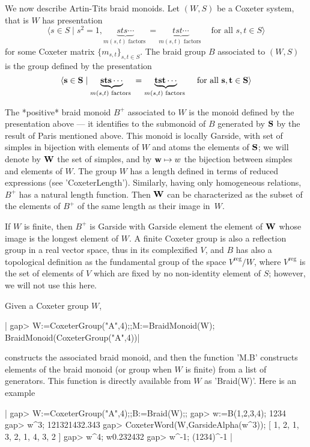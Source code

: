 We  now describe Artin-Tits braid monoids. Let $(W,S)$ be a Coxeter system,
that is $W$ has presentation
$$
  \langle s\in S \mid s^2=1,
         \underbrace{sts\cdots}_{m(s,t)\text{ factors }}=
         \underbrace{tst\cdots}_{m(s,t)\text{ factors }}
    \quad \text{for all $s,t\in S$} \rangle
$$
for some Coxeter matrix $\{m_{s,t}\}_{s,t\in S}$. The braid group $B$
associated to $(W,S)$ is the group defined by the presentation
$$
   \langle {\bf s}\in{\bf S}\mid
         \underbrace{{\bf s}{\bf t}{\bf s}\cdots}_{m(s,t)\text{ factors }}=
         \underbrace{{\bf t}{\bf s}{\bf t}\cdots}_{m(s,t)\text{ factors }}
    \quad \text{for all ${\bf s},{\bf t}\in{\bf S}$}\rangle
$$

The  *positive* braid monoid $B^+$ associated  to $W$ is the monoid defined
by  the  presentation  above  ---  it  identifies  to  the submonoid of $B$
generated  by ${\bf S}$ by the result of Paris mentioned above. This monoid
is  locally Garside, with set of simples  in bijection with elements of $W$
and  atoms  the  elements  of  ${\bf S}$;  we  will  denote by ${\bf W}$ the set of
simples,  and by ${\bf w}\mapsto w$ the  bijection between simples and elements
of  $W$. The group $W$ has a length defined in terms of reduced expressions
(see  'CoxeterLength'). Similarly, having only homogeneous relations, $B^+$
has  a  natural  length  function.  Then  ${\bf W}$ can be characterized as the
subset of the elements of $B^+$ of the same length as their image in~$W$.

If $W$ is finite, then $B^+$ is Garside with Garside element the element of
${\bf W}$  whose image is the longest element of $W$. A finite Coxeter group is
also  a reflection group in  a real vector space,  thus in its complexified
$V$,  and $B$ has also a topological definition as the fundamental group of
the space $V^{\text{reg}}/W$, where $V^{\text{reg}}$ is the set of elements
of  $V$ which are fixed by no non-identity element of $S$; however, we will
not use this here.

Given a Coxeter group $W$,

|    gap> W:=CoxeterGroup("A",4);;M:=BraidMonoid(W);
     BraidMonoid(CoxeterGroup("A",4))|

constructs  the  associated  braid  monoid,  and  then  the  function 'M.B'
constructs  elements of the braid monoid (or group when $W$ is finite) from
a  list  of  generators.  This  function  is directly available from $W$ as
'Braid(W)'. Here is an example\:

|    gap> W:=CoxeterGroup("A",4);;B:=Braid(W);;
    gap> w:=B(1,2,3,4);
    1234
    gap> w^3;
    121321432.343
    gap> CoxeterWord(W,GarsideAlpha(w^3));
    [ 1, 2, 1, 3, 2, 1, 4, 3, 2 ]
    gap> w^4;
    w0.232432
    gap> w^-1;
    (1234)^-1 |

